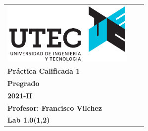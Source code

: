 \documentclass[12pt]{exam}
\newcommand{\class}{CS1000 ICC}
\newcommand{\term}{Pregrado}
\newcommand{\examnum}{Práctica Calificada 1}
\newcommand{\examdate}{2021-II}
\newcommand{\professor}{Profesor: Francisco Vilchez}
\newcommand{\seccion}{Lab 1.0(1,2)}
\begin{document}
\noindent
\begin{tabular*}{\textwidth}{l l  l}
    \begin{minipage}{1.8in}
        \includegraphics[width=\textwidth, height=30mm]{logo.png}
    \end{minipage}
    &
    \begin{minipage}{4.7in}
    \begin{flushright}
         \Large \textbf{\class} \normalsize \\
         \large \textbf{\examnum}\\
         \large \textbf{\term}\\
         \large \textbf{\examdate}\\
         \large \textbf{\professor}\\
         \large \textbf{\seccion}
    \end{flushright}
    \end{minipage}
 &\\
\end{tabular*}\\
\end{document}
